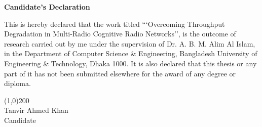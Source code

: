  \newpage
 \begin{center}
 \LARGE \textbf{Candidate's Declaration}
 \end{center}
 \vspace{3cm}
 This is hereby declared that the work titled ```Overcoming Throughput Degradation in Multi-Radio Cognitive Radio Networks'', is the outcome of research carried out by me under the supervision of Dr. A. B. M. Alim Al Islam, in the Department of Computer Science \& Engineering, Bangladesh University of Engineering \& Technology, Dhaka 1000. It is also declared that this thesis or any part of it has not been submitted elsewhere for the award of any degree or diploma.\\
 \vspace{4cm}
\begin{center}
 \line(1,0){200}\\
 \large
 Tanvir Ahmed Khan\\
 Candidate
\end{center}
 

 
 
 
